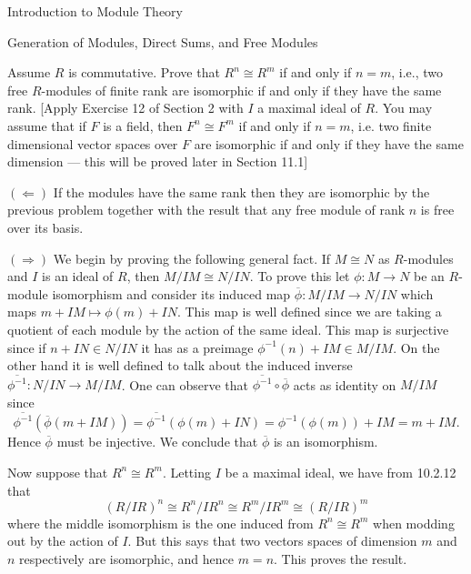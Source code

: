 \begin{chapter}{Introduction to Module Theory}
\begin{section}{Generation of Modules, Direct Sums, and Free Modules}
\begin{problem}\label{ex:10.3.2}
Assume $R$ is commutative. Prove that $R^n\cong R^m$ if and only if $n=m$, i.e., two free $R$-modules of finite rank are isomorphic if and only if they have the same rank. [Apply Exercise 12 of Section 2 with $I$ a maximal ideal of $R$. You may assume that if $F$ is a field, then $F^n\cong  F^m$ if and only if $n=m$, i.e. two finite dimensional vector spaces over $F$ are isomorphic if and only if they have the same dimension --- this will be proved later in Section 11.1]
\end{problem}
\begin{solution}
$(\Leftarrow)$ If the modules have the same rank then they are isomorphic by the previous problem together with the result that any free module of rank $n$ is free over its basis. 

$(\Rightarrow) $ We begin by proving the following general fact. If $M\cong N$ as $R$-modules and $I$ is an ideal of $R$, then $M/IM \cong N/IN$. To prove this let $\phi:M\to N$ be an $R$-module isomorphism and consider its induced map $\overline{\phi}:M/IM\to N/IN$ which maps $m+IM\mapsto \phi(m)+IN$. This map is well defined since we are taking a quotient of each module by the action of the same ideal. This map is surjective since if $n+IN\in N/IN$ it has as a preimage $\phi^{-1}(n) + IM\in M/IM$. On the other hand it is well defined to talk about the induced inverse $\overline{\phi^{-1}}:N/IN\to M/IM$. One can observe that $\overline{\phi^{-1}}\circ \overline{\phi}$ acts as identity on $M/IM$ since \[
\overline{\phi^{-1}}(\overline{\phi}(m+IM)) = \overline{\phi^{-1}}(\phi(m)+IN) = \phi^{-1}(\phi(m))+IM = m+IM.
\]
Hence $\overline{\phi}$ must be injective. We conclude that $\overline{\phi}$ is an isomorphism.
 
   Now suppose that $R^n\cong R^m$. Letting $I$ be a maximal ideal, we have from 10.2.12 that \[
(R/IR)^n \cong R^n/IR^n \cong  R^m/IR^m\cong(R/IR)^m\]
where the middle isomorphism is the one induced from $R^n\cong R^m$ when modding out by the action of $I$. But this says that two vectors spaces of dimension $m$ and $n$ respectively are isomorphic, and hence $m=n$. This proves the result.
\end{solution}\oneperpage




\end{section}
\end{chapter}
